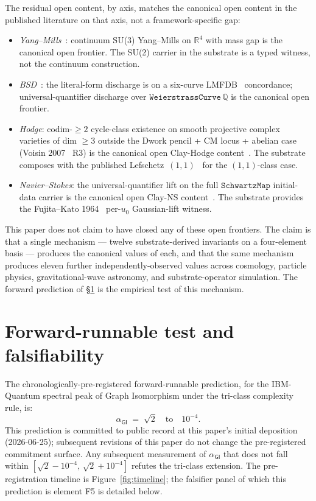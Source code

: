 \documentclass[11pt,a4paper]{amsart}
\theoremstyle{plain}
\theoremstyle{definition}
\begin{document}
The residual open content, by axis, matches the canonical open content in the published literature on that axis, not a framework-specific gap:
\begin{itemize}[itemsep=2pt]
\item \emph{Yang--Mills}~\cite{jaffewitten2006}: continuum SU(3) Yang--Mills on $\mathbb{R}^4$ with mass gap is the canonical open frontier. The SU(2) carrier in the substrate is a typed witness, not the continuum construction.
\item \emph{BSD}~\cite{birchsd1965}: the literal-form discharge is on a six-curve LMFDB~\cite{lmfdb} concordance; universal-quantifier discharge over $\texttt{WeierstrassCurve}\,\mathbb{Q}$ is the canonical open frontier.
\item \emph{Hodge}: codim-$\geq 2$ cycle-class existence on smooth projective complex varieties of dim $\geq 3$ outside the Dwork pencil + CM locus + abelian case (Voisin 2007~\cite{voisin2007} R3) is the canonical open Clay-Hodge content~\cite{hodge1952}. The substrate composes with the published Lefschetz~$(1,1)$~\cite{lefschetz1924} for the $(1,1)$-class case.
\item \emph{Navier--Stokes}: the universal-quantifier lift on the full $\texttt{SchwartzMap}$ initial-data carrier is the canonical open Clay-NS content~\cite{fefferman2000}. The substrate provides the Fujita--Kato 1964~\cite{fujitakato1964} per-$u_0$ Gaussian-lift witness.
\end{itemize}

This paper does not claim to have closed any of these open frontiers. The claim is that a single mechanism --- twelve substrate-derived invariants on a four-element basis --- produces the canonical values of each, and that the same mechanism produces eleven further independently-observed values across cosmology, particle physics, gravitational-wave astronomy, and substrate-operator simulation. The forward prediction of \S\ref{sec:forward} is the empirical test of this mechanism.

\section{Forward-runnable test and falsifiability}\label{sec:forward}

The chronologically-pre-registered forward-runnable prediction, for the IBM-Quantum spectral peak of Graph Isomorphism under the tri-class complexity rule, is:
\[
\boxed{\;\alpha_{\textsf{GI}} \;=\; \sqrt{2} \quad\textrm{to}\quad 10^{-4}.\;}
\]
This prediction is committed to public record at this paper's initial deposition (2026-06-25); subsequent revisions of this paper do not change the pre-registered commitment surface. Any subsequent measurement of $\alpha_{\textsf{GI}}$ that does not fall within $[\sqrt{2} - 10^{-4},\,\sqrt{2} + 10^{-4}]$ refutes the tri-class extension. The pre-registration timeline is Figure~\ref{fig:timeline}; the falsifier panel of which this prediction is element F5 is detailed below.
\end{document}
